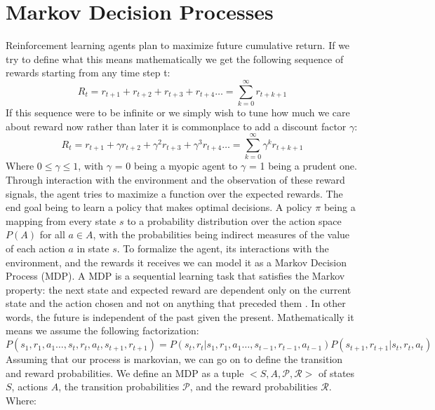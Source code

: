 \documentclass[msc, deptreport, ai, romanprepages]{infthesis}
\begin{document}
\section{Markov Decision Processes}
Reinforcement learning agents plan to maximize future cumulative return. If we try to define what this means mathematically we get the following sequence of rewards starting from any time step t:
\begin{equation}
R_t = r_{t+1} + r_{t+2} + r_{t+3} + r_{t+4}\ldots = \sum_{k=0}^\infty r_{t+k+1}
\end{equation}
If this sequence were to be infinite or we simply wish to tune how much we care about reward now rather than later it is commonplace to add a discount factor \(\gamma\):
\begin{equation}
R_t = r_{t+1} + \gamma r_{t+2} + \gamma^2 r_{t+3} + \gamma^3 r_{t+4}\ldots = \sum_{k=0}^\infty \gamma^k r_{t+k+1}
\end{equation}
Where \(0 \leq \gamma \leq 1\), with \(\gamma\) = 0 being a myopic agent to \(\gamma\) = 1 being a prudent one. Through interaction with the environment and the observation of these reward signals, the agent tries to maximize a function over the expected rewards. The end goal being to learn a policy that makes optimal decisions. A policy \(\pi\) being a mapping from every state \(s\) to a probability distribution over the action space \(P(A)\) for all \(a\in A\), with the probabilities being indirect measures of the value of each action \(a\) in state \(s\). 
To formalize the agent, its interactions with the environment, and the rewards it receives we can model it as a Markov Decision Process (MDP). A MDP is a sequential learning task that satisfies the Markov property: the next state and expected reward are dependent only on the current state and the action chosen and not on anything that preceded them \cite{Russell-norvig}. In other words, the future is independent of the past given the present. Mathematically it means we assume the following factorization:
\begin{equation}
P(s_1, r_1, a_1 \ldots , s_t, r_t, a_t, s_{t+1}, r_{t+1}) = P(s_t, r_t | s_1, r_1, a_1 \ldots , s_{t-1}, r_{t-1}, a_{t-1}) P(s_{t+1}, r_{t+1} | s_t, r_t, a_t)
\end{equation}
Assuming that our process is markovian, we can go on to define the transition and reward probabilities. We define an MDP as a tuple \(<S,A,\mathcal{P},\mathcal{R}>\) of states \(S\), actions \(A\), the transition probabilities \(\mathcal{P}\), and the reward probabilities \(\mathcal{R}\). Where:
\end{document}
